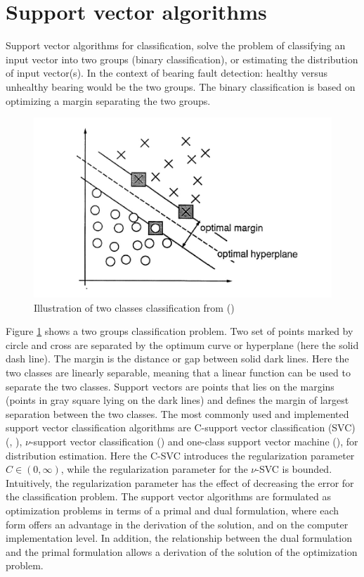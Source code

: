 \documentclass[../Main/thesis.tex]{subfiles}
\begin{document}
\section{Support vector algorithms }
\label{sec:svm}
Support vector algorithms for classification, solve the problem of classifying an input vector into two groups (binary classification), or estimating the distribution of input vector(s). In the context of bearing fault detection: healthy versus unhealthy bearing would be the two groups. The  binary classification is based on optimizing a margin separating the two groups. 
\begin{figure}[H] %
   \centering
   \includegraphics[width=5in]{../fig/svm2d.png} 
   \caption{Illustration of two classes classification from (\cite{vapnik1995})}
   \label{fig:svm2d}
\end{figure}
\justify
Figure \ref{fig:svm2d} shows a two groups classification problem. Two set of points marked by circle and cross are separated by the optimum curve or hyperplane (here the solid dash line). The margin is the distance or gap between solid dark lines. Here the two classes are linearly separable, meaning that a linear function can be used to separate the two classes. Support vectors are points that lies on the margins (points in gray square lying on the dark lines) and defines the margin of largest separation between the two classes.
\justify
The most commonly used and implemented support vector classification algorithms are  C-support vector classification (SVC) (\cite{bosser1992}, \cite{vapnik1995}), $\nu$-support vector classification (\cite{kp2000}) and one-class support vector machine (\cite{kp2001}), for distribution estimation. Here the C-SVC introduces the regularization parameter $C\in (0,\infty)$, while the regularization parameter for the $\nu$-SVC is bounded. Intuitively, the regularization parameter has the effect of decreasing the error for the classification problem.
\justify
The support vector algorithms are formulated as optimization problems in terms of a primal and dual formulation, where each form offers an advantage in the derivation of the solution, and on the computer implementation level. In addition, the relationship between the dual formulation and the primal formulation allows a derivation of the solution of the optimization problem. 
\end{document}
